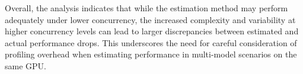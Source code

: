 Overall, the analysis indicates that while the estimation method may perform adequately under lower concurrency, the increased complexity and variability at higher concurrency levels can lead to larger discrepancies between estimated and actual performance drops. This underscores the need for careful consideration of profiling overhead when estimating performance in multi-model scenarios on the same GPU.




